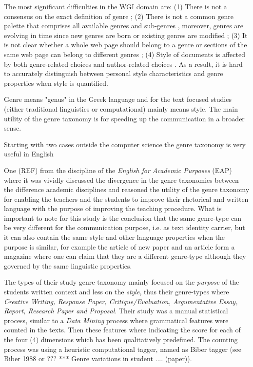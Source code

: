 The most significant difficulties in the WGI domain are: (1) There is not a consensus on the exact definition of genre \parencite{crowston2011problems}; (2) There is not a common genre  palette that comprises all available genres and sub-genres \parencite{santini2011cross,mehler2010genres_on_web,mason2009n,sharoff2010web}, moreover, genres are evolving in time since new  genres are born or existing genres are modified \parencite{Boese2005}; (3) It is not clear whether a whole web page should belong to a genre or sections of the same web page can belong to  different genres \parencite{jebari2015combination,madjarov2015web}; (4) Style of documents is affected by both genre-related choices and author-related choices \parencite{petrenz2011stable,Sharroff2010}. As a result, it is hard to accurately distinguish between personal style characteristics and genre properties when style is quantified.

Genre means "genus" in the Greek language and for the text focused studies (either traditional linguistics or computational) mainly means style. The main utility of the genre taxonomy is for speeding up the communication in a broader sense. 

Starting with two cases outside the computer science the genre taxonomy is very useful in English 

One (REF) from the discipline of the \textit{English for Academic Purposes} (EAP) where it was vividly discussed the divergence in the genre taxonomies between the difference academic disciplines and reasoned the utility of the genre taxonomy for enabling the teachers and the students to improve their rhetorical and written language with the purpose of improving the teaching procedure. What is important to note for this study is the conclusion that the same genre-type can be very different for the communication purpose, i.e. as text identity carrier, but it can also contain the same style and other language properties when the purpose is similar, for example the article of new paper and an article form a magazine where one can claim that they are a different genre-type although they governed by the same linguistic properties.

The types of their study genre taxonomy mainly focused on the \textit{purpose} of the students written context and less on the \textit{style}, thus their genre-types where \textit{Creative Writing, Response Paper, Critique/Evaluation, Argumentative Essay, Report, Research Paper and Proposal}. Their study was a manual statistical process, similar to a \textit{Data Mining} process where grammatical features were counted in the texts. Then these features where indicating the score for each of the four (4) dimensions which has been qualitatively predefined. The counting process was using a heuristic computational tagger, named as Biber tagger (see Biber 1988 or ??? *** Genre variations in student .... (paper)).   
  
